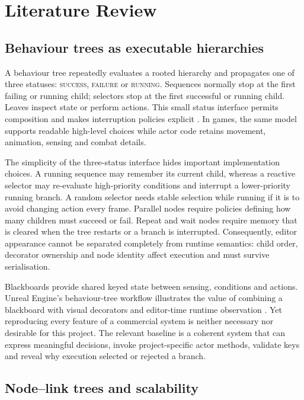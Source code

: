 \chapter{Literature Review}
\label{ch:literature}

\section{Behaviour trees as executable hierarchies}

A behaviour tree repeatedly evaluates a rooted hierarchy and propagates one of three statuses: \textsc{success}, \textsc{failure} or \textsc{running}. Sequences normally stop at the first failing or running child; selectors stop at the first successful or running child. Leaves inspect state or perform actions. This small status interface permits composition and makes interruption policies explicit \parencite{colledanchise2018bt}. In games, the same model supports readable high-level choices while actor code retains movement, animation, sensing and combat details.

The simplicity of the three-status interface hides important implementation choices. A running sequence may remember its current child, whereas a reactive selector may re-evaluate high-priority conditions and interrupt a lower-priority running branch. A random selector needs stable selection while running if it is to avoid changing action every frame. Parallel nodes require policies defining how many children must succeed or fail. Repeat and wait nodes require memory that is cleared when the tree restarts or a branch is interrupted. Consequently, editor appearance cannot be separated completely from runtime semantics: child order, decorator ownership and node identity affect execution and must survive serialisation.

Blackboards provide shared keyed state between sensing, conditions and actions. Unreal Engine's behaviour-tree workflow illustrates the value of combining a blackboard with visual decorators and editor-time runtime observation \parencite{unrealbt}. Yet reproducing every feature of a commercial system is neither necessary nor desirable for this project. The relevant baseline is a coherent system that can express meaningful decisions, invoke project-specific actor methods, validate keys and reveal why execution selected or rejected a branch.

\section{Node--link trees and scalability}

